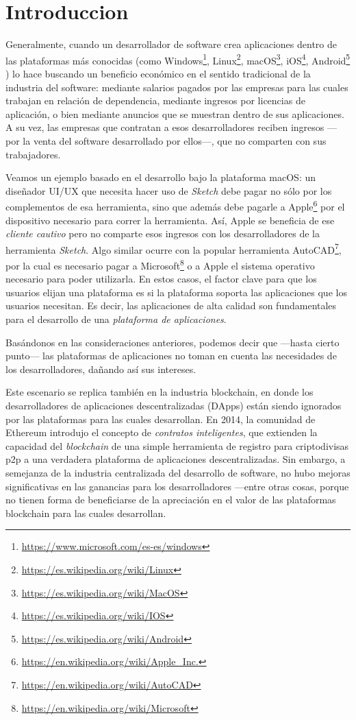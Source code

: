 \section{Introduccion}

\noindent
Generalmente, cuando un desarrollador de software crea aplicaciones dentro de las plataformas más conocidas (como
Windows\footnote{\url{https://www.microsoft.com/es-es/windows}}, Linux\footnote{\url{https://es.wikipedia.org/wiki/Linux}},
macOS\footnote{\url{https://es.wikipedia.org/wiki/MacOS}},
iOS\footnote{\url{https://es.wikipedia.org/wiki/IOS}},
Android\footnote{\url{https://es.wikipedia.org/wiki/Android}} \etc) lo hace buscando un beneficio económico en el sentido tradicional de la industria del software: mediante salarios pagados por las empresas para las cuales trabajan en relación de dependencia, mediante ingresos por licencias de aplicación, o bien mediante anuncios que se muestran dentro de sus aplicaciones. A su vez, las empresas que contratan a esos desarrolladores reciben ingresos —por la venta del software desarrollado por ellos—, que no comparten con sus trabajadores.

Veamos un ejemplo basado en el desarrollo bajo la plataforma macOS: un diseñador UI/UX que necesita hacer uso de \textit{Sketch} debe pagar no sólo por los complementos de esa herramienta, sino que además debe pagarle a Apple\footnote{\url{https://en.wikipedia.org/wiki/Apple_Inc.}}
por el dispositivo necesario para correr la herramienta. Así, Apple se beneficia de ese \textit{cliente cautivo} pero no comparte esos ingresos con los desarrolladores de la herramienta \textit{Sketch}. Algo similar ocurre con la popular herramienta AutoCAD\footnote{\url{https://en.wikipedia.org/wiki/AutoCAD}}, por la cual es necesario pagar a Microsoft\footnote{\url{https://en.wikipedia.org/wiki/Microsoft}} o a Apple el sistema operativo necesario para poder utilizarla. En estos casos, el factor clave para que los usuarios elijan una plataforma es si la plataforma soporta las aplicaciones que los usuarios necesitan. Es decir, las aplicaciones de alta calidad son fundamentales para el desarrollo de una \textit{plataforma de aplicaciones}.

Basándonos en las consideraciones anteriores, podemos decir que —hasta cierto punto— las plataformas de aplicaciones no toman en cuenta las necesidades de los desarrolladores, dañando así sus intereses.

Este escenario se replica también en la industria blockchain, en donde los desarrolladores de aplicaciones descentralizadas (DApps) están siendo ignorados por las plataformas para las cuales desarrollan. En 2014, la comunidad de Ethereum introdujo el concepto de \textit{contratos inteligentes}, que extienden la capacidad del \textit{blockchain} de una simple herramienta de registro para criptodivisas p2p a una verdadera plataforma de aplicaciones descentralizadas. Sin embargo, a semejanza de la industria centralizada del desarrollo de software, no hubo mejoras significativas en las ganancias para los desarrolladores —entre otras cosas, porque no tienen forma de beneficiarse de la apreciación en el valor de las plataformas blockchain para las cuales desarrollan.

